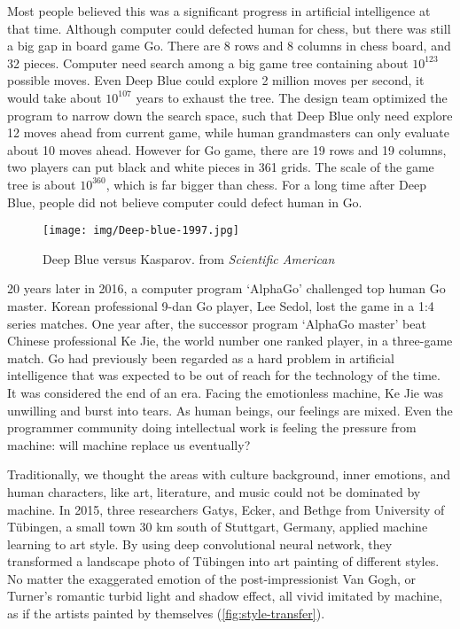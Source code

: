 \documentclass[b5paper]{article}
\begin{document}
Most people believed this was a significant progress in artificial intelligence at that time. Although computer could defected human for chess, but there was still a big gap in board game Go. There are 8 rows and 8 columns in chess board, and 32 pieces. Computer need search among a big game tree containing about $10^{123}$ possible moves. Even Deep Blue could explore 2 million moves per second, it would take about $10^{107}$ years to exhaust the tree. The design team optimized the program to narrow down the search space, such that Deep Blue only need explore 12 moves ahead from current game, while human grandmasters can only evaluate about 10 moves ahead. However for Go game, there are 19 rows and 19 columns, two players can put black and white pieces in 361 grids. The scale of the game tree is about $10^{360}$, which is far bigger than chess. For a long time after Deep Blue, people did not believe computer could defect human in Go.

\begin{figure}[htbp]
 \centering
 \texttt{[image: img/Deep-blue-1997.jpg]}
 \captionsetup{labelformat=empty}
 \caption{Deep Blue versus Kasparov. from {\em Scientific American}}
 \label{fig:Deep-blue-1997}
\end{figure}

20 years later in 2016, a computer program `AlphaGo' challenged top human Go master. Korean professional 9-dan Go player, Lee Sedol, lost the game in a 1:4 series matches. One year after, the successor program `AlphaGo master' beat Chinese professional Ke Jie, the world number one ranked player, in a three-game match. Go had previously been regarded as a hard problem in artificial intelligence that was expected to be out of reach for the technology of the time. It was considered the end of an era. Facing the emotionless machine, Ke Jie was unwilling and burst into tears. As human beings, our feelings are mixed. Even the programmer community doing intellectual work is feeling the pressure from machine: will machine replace us eventually?

Traditionally, we thought the areas with culture background, inner emotions, and human characters, like art, literature, and music could not be dominated by machine. In 2015, three researchers Gatys, Ecker, and Bethge from University of Tübingen, a small town 30 km south of Stuttgart, Germany, applied machine learning to art style. By using deep convolutional neural network, they transformed a landscape photo of Tübingen into art painting of different styles\cite{Gatys-2015}. No matter the exaggerated emotion of the post-impressionist Van Gogh, or Turner's romantic turbid light and shadow effect, all vivid imitated by machine, as if the artists painted by themselves (\cref{fig:style-transfer}).
\end{document}
